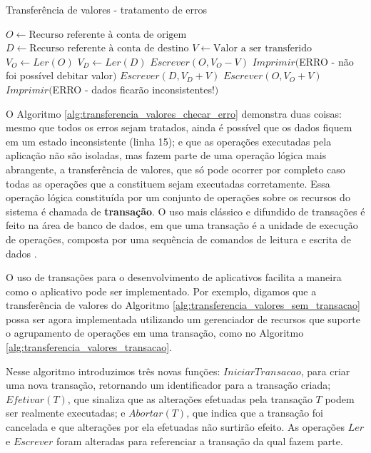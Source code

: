\documentclass[11pt,twoside,a4paper]{book}
\begin{document}
\begin{algorithm}
\caption{Transferência de valores - tratamento de erros}
\label{alg:transferencia_valores_checar_erro}
\begin{algorithmic}[1]
\State $O \gets \text{Recurso referente à conta de origem}$
\State $D \gets \text{Recurso referente à conta de destino}$
\State $V \gets \text{Valor a ser transferido}$
\State $V_O \gets Ler(O)$
    \State $V_D \gets Ler(D)$
    \State $Escrever(O, V_O - V)$
        \State $Imprimir($ERRO - não foi possível debitar valor$)$
    \Else
        \State $Escrever(D, V_D + V)$
            \State $Escrever(O, V_O + V)$
                \State $Imprimir($ERRO - dados ficarão inconsistentes!$)$
            \EndIf
        \EndIf
    \EndIf
\EndIf
\end{algorithmic}
\end{algorithm}

O Algoritmo \ref{alg:transferencia_valores_checar_erro} demonstra duas coisas: mesmo que todos os erros sejam tratados, ainda é possível que os dados fiquem em um estado inconsistente (linha 15); e que as operações executadas pela aplicação não são isoladas, mas fazem parte de uma operação lógica mais abrangente, a transferência de valores, que só pode ocorrer por completo caso todas as operações que a constituem sejam executadas corretamente. Essa operação lógica constituída por um conjunto de operações sobre os recursos do sistema é chamada de \textbf{transação}. O uso mais clássico e difundido de transações é feito na área de banco de dados, em que uma transação é a unidade de execução de operações, composta por uma sequência de comandos de leitura e escrita de dados \cite{garcia-molina, vaca}.

O uso de transações para o desenvolvimento de aplicativos facilita a maneira como o aplicativo pode ser implementado. Por exemplo, digamos que a transferência de valores do Algoritmo \ref{alg:transferencia_valores_sem_transacao} possa ser agora implementada utilizando um gerenciador de recursos que suporte o agrupamento de operações em uma transação, como no Algoritmo \ref{alg:transferencia_valores_transacao}. 

Nesse algoritmo introduzimos três novas funções: $IniciarTransacao$, para criar uma nova transação, retornando um identificador para a transação criada; $Efetivar(T)$, que sinaliza que as alterações efetuadas pela transação $T$ podem ser realmente executadas; e $Abortar(T)$, que indica que a transação foi cancelada e que alterações por ela efetuadas não surtirão efeito. As operações $Ler$ e $Escrever$ foram alteradas para referenciar a transação da qual fazem parte.
\end{document}
